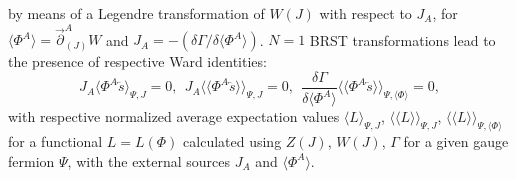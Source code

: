 \documentclass[10pt]{article}
\begin{document}
by means of a Legendre transformation of $W(J)$ with respect to $J_A$,
for $\langle \Phi^A\rangle = \overrightarrow{\partial}_{(J)}^{A} W $ and
$J_A = - (\delta  \Gamma / \delta \langle \Phi^A\rangle)$.
$N=1$ BRST transformations lead to the presence of respective Ward identities:
\begin{equation}\label{GFGFWIN1}
J_A\langle \Phi^A \overleftarrow{s}\rangle_{\Psi,J}=0, \ \ J_A\langle\langle \Phi^A \overleftarrow{s}\rangle\rangle_{\Psi,J}=0, \ \ \frac{\delta \Gamma}{\delta \langle \Phi^A\rangle}\langle\langle \Phi^A \overleftarrow{s}\rangle\rangle_{\Psi, \langle \Phi\rangle} =0,
 \end{equation}
with respective normalized average expectation values
$\langle L\rangle_{\Psi,J}$, $\langle\langle L\rangle\rangle_{\Psi,J}$,
$\langle\langle L\rangle\rangle_{\Psi, \langle \Phi\rangle}$
for a functional $L=L(\Phi)$ calculated using $Z(J)$, $W(J)$, $\Gamma$
for a given gauge fermion $\Psi$, with the external sources $J_A$ and $\langle \Phi^A\rangle$.
\end{document}
